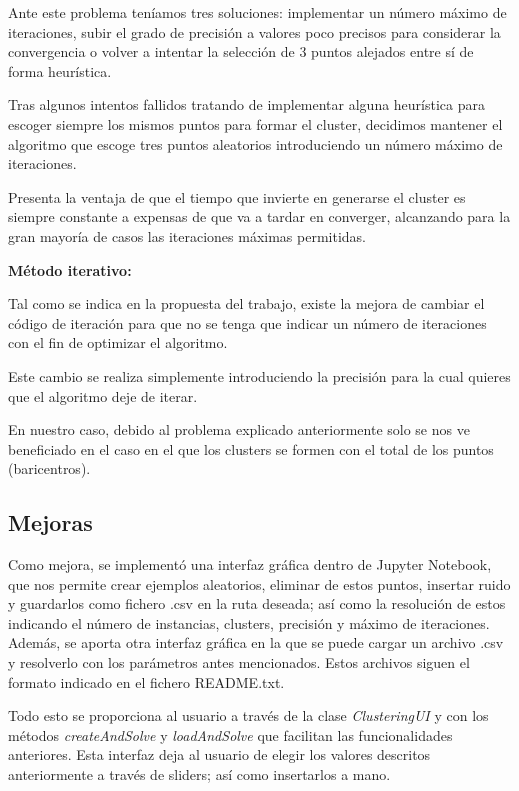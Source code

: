 \documentclass[conference,a4paper]{IEEEtran}
\begin{document}
Ante este problema teníamos tres soluciones: implementar un número máximo de iteraciones, subir el grado de precisión a valores poco precisos para considerar la convergencia o volver a intentar la selección de 3 puntos alejados entre sí de forma heurística.

Tras algunos intentos fallidos tratando de implementar alguna heurística para escoger siempre los mismos puntos para formar el cluster, decidimos mantener el algoritmo que escoge tres puntos aleatorios introduciendo un número máximo de iteraciones.

Presenta la ventaja de que el tiempo que invierte en generarse el cluster es siempre constante a expensas de que va a tardar en converger, alcanzando para la gran mayoría de casos las iteraciones máximas permitidas.

\textbf{Método iterativo:}

Tal como se indica en la propuesta del trabajo, existe la mejora de cambiar el código de iteración para que no se tenga que indicar un número de iteraciones con el fin de optimizar el algoritmo.

Este cambio se realiza simplemente introduciendo la precisión para la cual quieres que el algoritmo deje de iterar.

En nuestro caso, debido al problema explicado anteriormente solo se nos ve beneficiado en el caso en el que los clusters se formen con el total de los puntos (baricentros).

\clearpage
\subsection{Mejoras}

Como mejora, se implementó una interfaz gráfica dentro de Jupyter Notebook, que nos permite crear ejemplos aleatorios, eliminar de estos puntos, insertar ruido y guardarlos como fichero .csv en la ruta deseada; así como la resolución de estos indicando el número de instancias, clusters, precisión y máximo de iteraciones. Además, se aporta otra interfaz gráfica en la que se puede cargar un archivo .csv y resolverlo con los parámetros antes mencionados. Estos archivos siguen el formato indicado en el fichero README.txt.

Todo esto se proporciona al usuario a través de la clase \textit{ClusteringUI} y con los métodos \textit{createAndSolve} y \textit{loadAndSolve} que facilitan las funcionalidades anteriores. Esta interfaz deja al usuario de elegir los valores descritos anteriormente a través de sliders; así como insertarlos a mano.
\end{document}
